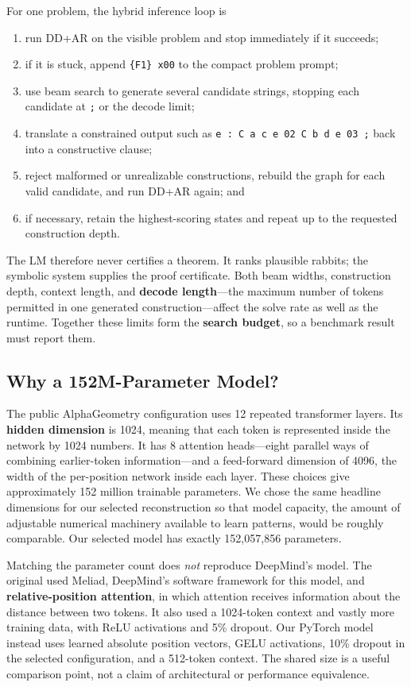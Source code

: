\documentclass[reqno]{amsart}
\newcommand{\keyterm}[1]{\textbf{\color{agblue}#1}}
\DeclareMathOperator{\1}{\textbf{1}}
\begin{document}
For one problem, the hybrid inference loop is
\begin{enumerate}
    \item run DD+AR on the visible problem and stop immediately if it succeeds;
    \item if it is stuck, append \verb|{F1} x00| to the compact problem prompt;
    \item use beam search to generate several candidate strings, stopping each
          candidate at \verb|;| or the decode limit;
    \item translate a constrained output such as
          \verb|e : C a c e 02 C b d e 03 ;| back into a constructive clause;
    \item reject malformed or unrealizable constructions, rebuild the graph
          for each valid candidate, and run DD+AR again; and
    \item if necessary, retain the highest-scoring states and repeat up to the
          requested construction depth.
\end{enumerate}
The LM therefore never certifies a theorem.  It ranks plausible rabbits; the
symbolic system supplies the proof certificate.  Both beam widths, construction
depth, context length, and \keyterm{decode length}---the maximum number of
tokens permitted in one generated construction---affect the solve rate as well
as the runtime.  Together these limits form the \keyterm{search budget}, so a
benchmark result must report them.

\subsection{Why a 152M-Parameter Model?}

The public AlphaGeometry configuration uses 12 repeated transformer layers.
Its \keyterm{hidden dimension} is 1024, meaning that each token is represented
inside the network by 1024 numbers.  It has 8 attention heads---eight parallel
ways of combining earlier-token information---and a feed-forward dimension of
4096, the width of the per-position network inside each layer.  These choices
give approximately 152 million trainable parameters.  We chose the same
headline dimensions for our selected reconstruction so that model capacity,
the amount of adjustable numerical machinery available to learn patterns,
would be roughly comparable.  Our selected model has exactly 152,057,856
parameters.

Matching the parameter count does \emph{not} reproduce DeepMind's model.  The
original used Meliad, DeepMind's software framework for this model, and
\keyterm{relative-position attention}, in which attention receives information
about the distance between two tokens.  It also used a 1024-token context and
vastly more training data, with ReLU activations and 5\% dropout. Our PyTorch
model instead uses learned absolute position vectors, GELU activations, 10\%
dropout in the selected configuration, and a 512-token context. The shared
size is a useful comparison point, not a claim
of architectural or performance equivalence.
\end{document}
